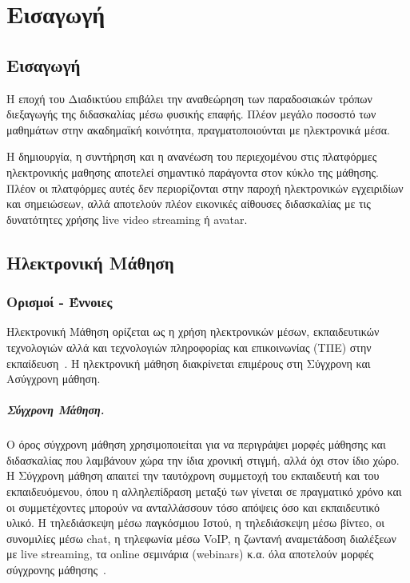 \documentclass[12pt]{report}
\begin{document}
\hypersetup{pageanchor=true}
\clearpage
{}

\chapter{Εισαγωγή}\label{ch1}
\section{Εισαγωγή}
Η εποχή του Διαδικτύου επιβάλει την αναθεώρηση των παραδοσιακών τρόπων διεξαγωγής της διδασκαλίας μέσω φυσικής επαφής. Πλέον μεγάλο ποσοστό των μαθημάτων στην ακαδημαϊκή κοινότητα, πραγματοποιούνται με ηλεκτρονικά μέσα.

Η δημιουργία, η συντήρηση και η ανανέωση του περιεχομένου στις πλατφόρμες ηλεκτρονικής μαθησης αποτελεί σημαντικό παράγοντα στον κύκλο της μάθησης. Πλέον οι πλατφόρμες αυτές δεν περιορίζονται στην παροχή ηλεκτρονικών εγχειριδίων και σημειώσεων, αλλά αποτελούν πλέον εικονικές αίθουσες διδασκαλίας με τις δυνατότητες χρήσης \textlatin{live video streaming} ή \textlatin{avatar}.

\section{Ηλεκτρονική Μάθηση}
\subsection{Ορισμοί - Έννοιες}
Ηλεκτρονική Μάθηση ορίζεται ως η χρήση ηλεκτρονικών μέσων, εκπαιδευτικών τεχνολογιών αλλά και τεχνολογιών πληροφορίας και επικοινωνίας (ΤΠΕ) στην εκπαίδευση~\cite{wikipedia_2018_1}. Η ηλεκτρονική μάθηση διακρίνεται επιμέρους στη Σύγχρονη και Ασύγχρονη μάθηση.
  \paragraph{Σύγχρονη Mάθηση.} Ο όρος σύγχρονη μάθηση χρησιμοποιείται για να περιγράψει μορφές μάθησης και διδασκαλίας που λαμβάνουν χώρα την ίδια χρονική στιγμή, αλλά όχι στον ίδιο χώρο. Η Σύγχρονη μάθηση απαιτεί την ταυτόχρονη συμμετοχή του εκπαιδευτή και του εκπαιδευόμενου, όπου η αλληλεπίδραση μεταξύ των γίνεται σε πραγματικό χρόνο και οι συμμετέχοντες μπορούν να ανταλλάσσουν τόσο απόψεις όσο και εκπαιδευτικό υλικό. Η τηλεδιάσκεψη μέσω παγκόσμιου Ιστού, η τηλεδιάσκεψη μέσω βίντεο, οι συνομιλίες μέσω chat, η τηλεφωνία μέσω VoIP, η ζωντανή αναμετάδοση διαλέξεων με live streaming, τα online σεμινάρια (webinars) κ.α. όλα αποτελούν μορφές σύγχρονης μάθησης~\cite{moore_kearsley_2005}.
\end{document}
